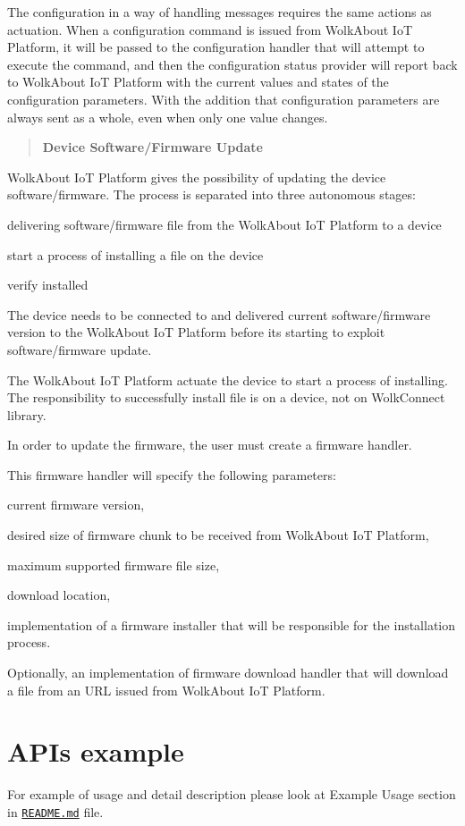The configuration in a way of handling messages requires the same actions as actuation. When a configuration command is issued from Wolk\+About IoT Platform, it will be passed to the configuration handler that will attempt to execute the command, and then the configuration status provider will report back to Wolk\+About IoT Platform with the current values and states of the configuration parameters. With the addition that configuration parameters are always sent as a whole, even when only one value changes.

\label{_dfu}%
 \begin{quote}
{\bfseries Device Software/\+Firmware Update} \end{quote}
Wolk\+About IoT Platform gives the possibility of updating the device software/firmware. The process is separated into three autonomous stages\+:


\begin{DoxyItemize}
\item delivering software/firmware file from the Wolk\+About IoT Platform to a device
\item start a process of installing a file on the device
\item verify installed
\end{DoxyItemize}

The device needs to be connected to and delivered current software/firmware version to the Wolk\+About IoT Platform before it\textquotesingle{}s starting to exploit software/firmware update.

The Wolk\+About IoT Platform actuate the device to start a process of installing. The responsibility to successfully install file is on a device, not on Wolk\+Connect library.

In order to update the firmware, the user must create a firmware handler.

This firmware handler will specify the following parameters\+:


\begin{DoxyItemize}
\item current firmware version,
\item desired size of firmware chunk to be received from Wolk\+About IoT Platform,
\item maximum supported firmware file size,
\item download location,
\item implementation of a firmware installer that will be responsible for the installation process.
\item Optionally, an implementation of firmware download handler that will download a file from an U\+RL issued from Wolk\+About IoT Platform.
\end{DoxyItemize}



 \section*{A\+PI\textquotesingle{}s example}



 For example of usage and detail description please look at Example Usage section in \href{md_examples_full_feature_set_README.html}{\tt R\+E\+A\+D\+M\+E.\+md} file. 
